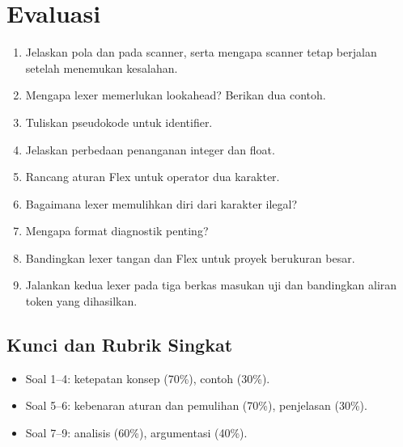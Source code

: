 \section*{Evaluasi}

\begin{enumerate}[label=\arabic*.,leftmargin=*]
  \item Jelaskan pola  dan  pada scanner, serta
        mengapa scanner tetap berjalan setelah menemukan kesalahan.
  \item Mengapa lexer memerlukan lookahead? Berikan dua contoh.
  \item Tuliskan pseudokode  untuk identifier.
  \item Jelaskan perbedaan penanganan integer dan float.
  \item Rancang aturan Flex untuk operator dua karakter.
  \item Bagaimana lexer memulihkan diri dari karakter ilegal?
  \item Mengapa format diagnostik  penting?
  \item Bandingkan lexer tangan dan Flex untuk proyek berukuran
        besar.
  \item Jalankan kedua lexer pada tiga berkas masukan uji dan
        bandingkan aliran token yang dihasilkan.
\end{enumerate}

\subsection*{Kunci dan Rubrik Singkat}
\begin{itemize}[leftmargin=*]
  \item Soal 1--4: ketepatan konsep (70\%), contoh (30\%).
  \item Soal 5--6: kebenaran aturan dan pemulihan (70\%),
        penjelasan (30\%).
  \item Soal 7--9: analisis (60\%), argumentasi (40\%).
\end{itemize}
